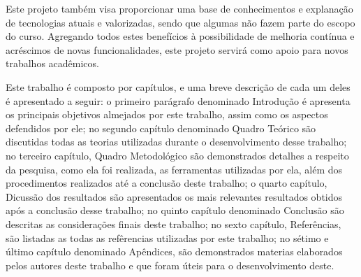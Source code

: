 \par Este projeto também visa proporcionar uma base de conhecimentos e explanação de tecnologias atuais e valorizadas, sendo que algumas não fazem parte do escopo do curso. Agregando todos estes benefícios à possibilidade de melhoria contínua e acréscimos de novas funcionalidades, este projeto servirá como apoio para novos trabalhos acadêmicos.

\par Este trabalho é composto por capítulos, e uma breve descrição de cada um deles é apresentado a seguir: o primeiro parágrafo denominado Introdução é apresenta os principais objetivos almejados por este trabalho, assim como os aspectos defendidos por ele; no segundo capítulo denominado Quadro Teórico são discutidas todas as teorias utilizadas durante o desenvolvimento desse trabalho; no terceiro capítulo, Quadro Metodológico são demonstrados detalhes a respeito da pesquisa, como ela foi realizada, as ferramentas utilizadas por ela, além dos procedimentos realizados até a conclusão deste trabalho; o quarto capítulo, Dicussão dos resultados são apresentados os mais relevantes resultados obtidos após a conclusão desse trabalho; no quinto capítulo denominado Conclusão são descritas as considerações finais deste trabalho; no sexto capítulo, Referências, são listadas as todas as refêrencias utilizadas por este trabalho; no sétimo e último capítulo denominado Apêndices, são demonstrados materias elaborados pelos autores deste trabalho e que foram úteis para o desenvolvimento deste.